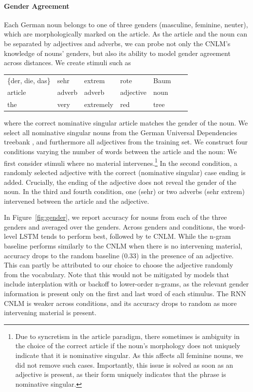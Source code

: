 \paragraph{Gender Agreement}
Each German noun belongs to one of three genders (masculine, feminine, neuter), which are morphologically marked on the article.
As the article and the noun can be separated by adjectives and adverbs, we can probe not only the CNLM's knowledge of nouns' genders, but also its ability to model gender agreement across distances.
We create stimuli such as
\begin{tabular}{lllllll}
	\{der, die, das\}& sehr& extrem& rote& Baum \\
	article & adverb & adverb & adjective & noun \\
	the & very & extremely & red & tree
\end{tabular}
where the correct nominative singular article matches the gender of the noun.
We select all nominative singular nouns from the German Universal Dependencies treebank \cite{de2006generating,mcdonald2013universal}, and furthermore all adjectives from the training set.
We construct four conditions varying the number of words between the article and the noun:
We first consider stimuli where no material intervenes.\footnote{Due to syncretism in the article paradigm, there sometimes is ambiguity in the choice of the correct article if the noun's morphology does not uniquely indicate that it is nominative singular. As this affects all feminine nouns, we did not remove such cases. Importantly, this issue is solved as soon as an adjective is present, as their form uniquely indicates that the phrase is nominative singular.}
In the second condition, a randomly selected adjective with the correct (nominative singular) case ending is added.
Crucially, the ending of the adjective does not reveal the gender of the noun.
In the third and fourth condition, one (sehr) or two adverbs (sehr extrem) intervened between the article and the adjective.

In Figure~\ref{fig:gender}, we report accuracy for nouns from each of the three genders and averaged over the genders.
Across genders and conditions, the word-level LSTM tends to perform best, followed by te CNLM.
While the n-gram baseline performs similarly to the CNLM when there is no intervening material, accuracy drops to the random baseline (0.33) in the presence of an adjective.
This can partly be attributed to our choice to choose the adjective randomly from the vocabulary.
Note that this would not be mitigated by models that include interplation with or backoff to lower-order n-grams, as the relevant gender information is present only on the first and last word of each stimulus.
The RNN CNLM is weaker across conditions, and its accuracy drops to random as more intervening material is present.

